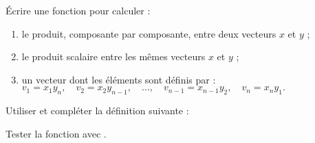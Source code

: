 Écrire une fonction pour calculer :
\begin{enumerate}
  \item le produit, composante par composante, entre deux vecteurs $x$ et $y$ ;
  \item le produit scalaire entre les mêmes vecteurs $x$ et $y$ ;
  \item un vecteur dont les éléments sont définis par : \\
        $v_1 = x_{1} y_n, \quad
        v_2 = x_2 y_{n-1}, \quad
        \dots, \quad
        v_{n-1} = x_{n-1} y_2, \quad
        v_n = x_n y_1.$
\end{enumerate}


Utiliser et compléter la définition suivante :


Tester la fonction avec \MAT.

